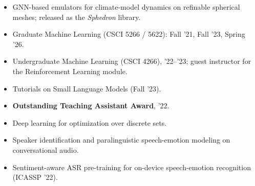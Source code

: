 
{
\footnotesize
\begin{itemize}
\item GNN-based emulators for climate-model dynamics on refinable spherical meshes; released as the \textit{Sphedron} library.
\end{itemize}
\vspace{-5pt}
}
\divider

{
\footnotesize
\begin{itemize}
\item Graduate Machine Learning (CSCI 5266 / 5622): Fall '21, Fall '23, Spring '26.
\item Undergraduate Machine Learning (CSCI 4266), '22--'23; guest instructor for the Reinforcement Learning module.
\item Tutorials on Small Language Models (Fall '23).
\item \textbf{Outstanding Teaching Assistant Award}, '22.
\end{itemize}
\vspace{-5pt}
}
\divider


{
\footnotesize
\begin{itemize}
\item Deep learning for optimization over discrete sets.
\end{itemize}
\vspace{-5pt}
}
\divider

{
\footnotesize
\begin{itemize}
\item Speaker identification and paralinguistic speech-emotion modeling on conversational audio.
\end{itemize}
\vspace{-5pt}
}
\divider

{
\footnotesize
\begin{itemize}
\item Sentiment-aware ASR pre-training for on-device speech-emotion recognition (ICASSP '22).
\end{itemize}
\vspace{-5pt}
}
\divider

